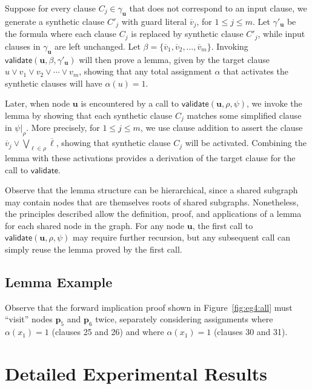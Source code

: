 \documentclass[letterpaper,USenglish,cleveref, autoref, thm-restate]{lipics-v2021}
\newcommand{\obar}[1]{\overline{#1}}
\newcommand{\lit}{\ell}
\newcommand{\assign}{\alpha}
\newcommand{\passign}{\rho}
\newcommand{\lassign}{\beta}
\newcommand{\validate}{\textsf{validate}}
\newcommand{\makenode}[1]{\mathbf{#1}}
\newcommand{\nodeu}{\makenode{u}}
\newcommand{\nodep}{\makenode{p}}
\newcommand{\simplify}[2]{#1|_{#2}}
\begin{document}
Suppose for every clause $C_j \in \gamma_{\nodeu}$ that does not correspond to
an input clause, we generate a synthetic clause $C'_j$ with guard literal
$\obar{v}_j$, for $1 \leq j \leq m$.  Let $\gamma'_{\nodeu}$ be the formula where each clause $C_j$ is replaced by synthetic clause $C'_j$,
while input clauses in $\gamma_{\nodeu}$ are left unchanged.
Let $\lassign = \{ \obar{v}_1, \obar{v}_2, \ldots, \obar{v}_m \}$.
Invoking $\validate(\nodeu, \lassign, \gamma'_{\nodeu})$
 will then prove a lemma, given by the target clause
 $u \lor v_1 \lor v_2 \lor \cdots \lor v_m$,
 showing that any total assignment $\assign$ that activates the synthetic clauses will have $\assign(u) = 1$.

Later, when node $\nodeu$ is encountered by a call to $\validate(\nodeu, \passign, \psi)$, we invoke the lemma
by showing that each synthetic clause
$C_j$ matches some simplified clause in $\simplify{\psi}{\passign}$.  More precisely,
for $1 \leq j \leq m$,
we use clause addition to assert the clause
$\obar{v}_j \lor \bigvee_{\lit \in \passign} \obar{\lit}$,
showing that synthetic clause $C_j$ will be activated.
Combining the lemma with these activations provides a derivation of the target clause for the call to $\validate$.

Observe that the lemma structure can be hierarchical, since a shared
subgraph may contain nodes that are themselves roots of shared
subgraphs.  Nonetheless, the principles described allow the
definition, proof, and applications of a lemma for each shared node in
the graph.  For any node $\nodeu$, the first call to
$\validate(\nodeu, \passign, \psi)$ may require further recursion,
but any subsequent call can simply reuse the lemma proved by the first call.

\subsection{Lemma Example}
Observe that the forward implication proof shown in Figure~\ref{fig:eg4:all}  must ``visit'' nodes
$\nodep_5$ and $\nodep_6$ twice, separately considering  assignments where $\assign(x_1) = 1$
(clauses 25 and 26) and where $\assign(x_1) = 1$ (clauses 30 and 31).




\section{Detailed Experimental Results}
\label{app:experiments}










\end{document}
